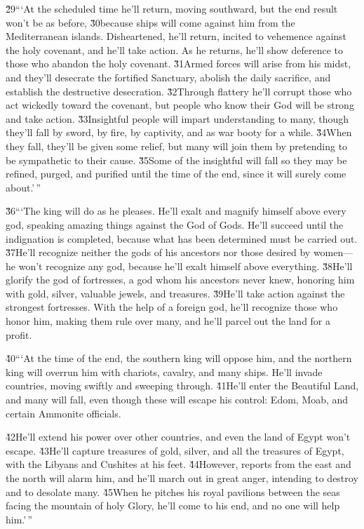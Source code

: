 \v{29}```At the scheduled time he'll return, moving southward, but the end result won't be as before, \v{30}because ships will come against him from the Mediterranean islands. Disheartened, he'll return, incited to vehemence against the holy covenant, and he'll take action. As he returns, he'll show deference to those who abandon the holy covenant. \v{31}Armed forces will arise from his midst, and they'll desecrate the fortified Sanctuary, abolish the daily sacrifice, and establish the destructive desecration. \v{32}Through flattery he'll corrupt those who act wickedly toward the covenant, but people who know their God will be strong and take action. \v{33}Insightful people will impart understanding to many, though they'll fall by sword, by fire, by captivity, and as war booty for a while. \v{34}When they fall, they'll be given some relief, but many will join them by pretending to be sympathetic to their cause. \v{35}Some of the insightful will fall so they may be refined, purged, and purified until the time of the end, since it will surely come about.'\,''

\v{36}```The king will do as he pleases. He'll exalt and magnify himself above every god, speaking amazing things against the God of Gods. He'll succeed until the indignation is completed, because what has been determined must be carried out. \v{37}He'll recognize neither the gods of his ancestors nor those desired by women---he won't recognize any god, because he'll exalt himself above everything. \v{38}He'll glorify the god of fortresses, a god whom his ancestors never knew, honoring him with gold, silver, valuable jewels, and treasures. \v{39}He'll take action against the strongest fortresses. With the help of a foreign god, he'll recognize those who honor him, making them rule over many, and he'll parcel out the land for a profit.

\v{40}```At the time of the end, the southern king will oppose him, and the northern king will overrun him with chariots, cavalry, and many ships. He'll invade countries, moving swiftly and sweeping through. \v{41}He'll enter the Beautiful Land, and many will fall, even though these will escape his control: Edom, Moab, and certain Ammonite officials.

\v{42}He'll extend his power over other countries, and even the land of Egypt won't escape. \v{43}He'll capture treasures of gold, silver, and all the treasures of Egypt, with the Libyans and Cushites at his feet. \v{44}However, reports from the east and the north will alarm him, and he'll march out in great anger, intending to destroy and to desolate many. \v{45}When he pitches his royal pavilions between the seas facing the mountain of holy Glory, he'll come to his end, and no one will help him.'\,''


